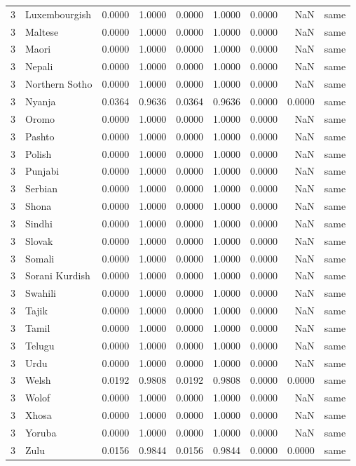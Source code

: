 \begin{tabular}{rlrrrrrrl}
3 & Luxembourgish & 0.0000 & 1.0000 & 0.0000 & 1.0000 & 0.0000 & NaN & same \\
3 & Maltese & 0.0000 & 1.0000 & 0.0000 & 1.0000 & 0.0000 & NaN & same \\
3 & Maori & 0.0000 & 1.0000 & 0.0000 & 1.0000 & 0.0000 & NaN & same \\
3 & Nepali & 0.0000 & 1.0000 & 0.0000 & 1.0000 & 0.0000 & NaN & same \\
3 & Northern Sotho & 0.0000 & 1.0000 & 0.0000 & 1.0000 & 0.0000 & NaN & same \\
3 & Nyanja & 0.0364 & 0.9636 & 0.0364 & 0.9636 & 0.0000 & 0.0000 & same \\
3 & Oromo & 0.0000 & 1.0000 & 0.0000 & 1.0000 & 0.0000 & NaN & same \\
3 & Pashto & 0.0000 & 1.0000 & 0.0000 & 1.0000 & 0.0000 & NaN & same \\
3 & Polish & 0.0000 & 1.0000 & 0.0000 & 1.0000 & 0.0000 & NaN & same \\
3 & Punjabi & 0.0000 & 1.0000 & 0.0000 & 1.0000 & 0.0000 & NaN & same \\
3 & Serbian & 0.0000 & 1.0000 & 0.0000 & 1.0000 & 0.0000 & NaN & same \\
3 & Shona & 0.0000 & 1.0000 & 0.0000 & 1.0000 & 0.0000 & NaN & same \\
3 & Sindhi & 0.0000 & 1.0000 & 0.0000 & 1.0000 & 0.0000 & NaN & same \\
3 & Slovak & 0.0000 & 1.0000 & 0.0000 & 1.0000 & 0.0000 & NaN & same \\
3 & Somali & 0.0000 & 1.0000 & 0.0000 & 1.0000 & 0.0000 & NaN & same \\
3 & Sorani Kurdish & 0.0000 & 1.0000 & 0.0000 & 1.0000 & 0.0000 & NaN & same \\
3 & Swahili & 0.0000 & 1.0000 & 0.0000 & 1.0000 & 0.0000 & NaN & same \\
3 & Tajik & 0.0000 & 1.0000 & 0.0000 & 1.0000 & 0.0000 & NaN & same \\
3 & Tamil & 0.0000 & 1.0000 & 0.0000 & 1.0000 & 0.0000 & NaN & same \\
3 & Telugu & 0.0000 & 1.0000 & 0.0000 & 1.0000 & 0.0000 & NaN & same \\
3 & Urdu & 0.0000 & 1.0000 & 0.0000 & 1.0000 & 0.0000 & NaN & same \\
3 & Welsh & 0.0192 & 0.9808 & 0.0192 & 0.9808 & 0.0000 & 0.0000 & same \\
3 & Wolof & 0.0000 & 1.0000 & 0.0000 & 1.0000 & 0.0000 & NaN & same \\
3 & Xhosa & 0.0000 & 1.0000 & 0.0000 & 1.0000 & 0.0000 & NaN & same \\
3 & Yoruba & 0.0000 & 1.0000 & 0.0000 & 1.0000 & 0.0000 & NaN & same \\
3 & Zulu & 0.0156 & 0.9844 & 0.0156 & 0.9844 & 0.0000 & 0.0000 & same \\
\bottomrule
\end{tabular}
